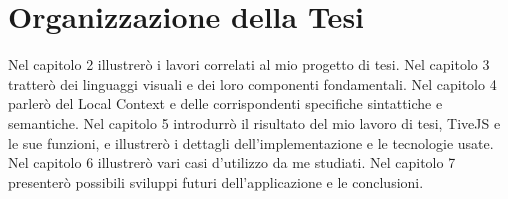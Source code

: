     \section{Organizzazione della Tesi}
        Nel capitolo 2 illustrerò i lavori correlati al mio progetto di tesi.
        Nel capitolo 3 tratterò dei linguaggi visuali e dei loro componenti fondamentali. Nel capitolo 4 parlerò del Local Context e delle corrispondenti specifiche sintattiche e semantiche. Nel capitolo 5 introdurrò il risultato del mio lavoro di tesi, TiveJS e le sue funzioni, e illustrerò  i dettagli dell'implementazione e le tecnologie usate. Nel capitolo 6 illustrerò vari casi d'utilizzo da me studiati. Nel capitolo 7 presenterò possibili sviluppi futuri dell'applicazione e le conclusioni.